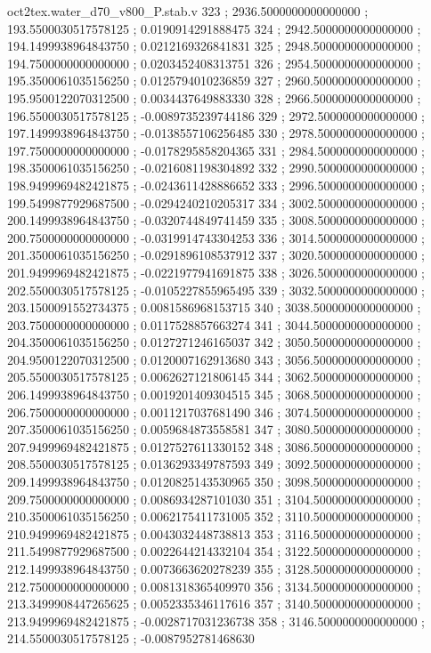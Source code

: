 \begin{filecontents}[overwrite]{oct2tex.water_d70_v800_P.stab.v}
323 ; 2936.5000000000000000 ; 193.5500030517578125 ; 0.0190914291888475
324 ; 2942.5000000000000000 ; 194.1499938964843750 ; 0.0212169326841831
325 ; 2948.5000000000000000 ; 194.7500000000000000 ; 0.0203452408313751
326 ; 2954.5000000000000000 ; 195.3500061035156250 ; 0.0125794010236859
327 ; 2960.5000000000000000 ; 195.9500122070312500 ; 0.0034437649883330
328 ; 2966.5000000000000000 ; 196.5500030517578125 ; -0.0089735239744186
329 ; 2972.5000000000000000 ; 197.1499938964843750 ; -0.0138557106256485
330 ; 2978.5000000000000000 ; 197.7500000000000000 ; -0.0178295858204365
331 ; 2984.5000000000000000 ; 198.3500061035156250 ; -0.0216081198304892
332 ; 2990.5000000000000000 ; 198.9499969482421875 ; -0.0243611428886652
333 ; 2996.5000000000000000 ; 199.5499877929687500 ; -0.0294240210205317
334 ; 3002.5000000000000000 ; 200.1499938964843750 ; -0.0320744849741459
335 ; 3008.5000000000000000 ; 200.7500000000000000 ; -0.0319914743304253
336 ; 3014.5000000000000000 ; 201.3500061035156250 ; -0.0291896108537912
337 ; 3020.5000000000000000 ; 201.9499969482421875 ; -0.0221977941691875
338 ; 3026.5000000000000000 ; 202.5500030517578125 ; -0.0105227855965495
339 ; 3032.5000000000000000 ; 203.1500091552734375 ; 0.0081586968153715
340 ; 3038.5000000000000000 ; 203.7500000000000000 ; 0.0117528857663274
341 ; 3044.5000000000000000 ; 204.3500061035156250 ; 0.0127271246165037
342 ; 3050.5000000000000000 ; 204.9500122070312500 ; 0.0120007162913680
343 ; 3056.5000000000000000 ; 205.5500030517578125 ; 0.0062627121806145
344 ; 3062.5000000000000000 ; 206.1499938964843750 ; 0.0019201409304515
345 ; 3068.5000000000000000 ; 206.7500000000000000 ; 0.0011217037681490
346 ; 3074.5000000000000000 ; 207.3500061035156250 ; 0.0059684873558581
347 ; 3080.5000000000000000 ; 207.9499969482421875 ; 0.0127527611330152
348 ; 3086.5000000000000000 ; 208.5500030517578125 ; 0.0136293349787593
349 ; 3092.5000000000000000 ; 209.1499938964843750 ; 0.0120825143530965
350 ; 3098.5000000000000000 ; 209.7500000000000000 ; 0.0086934287101030
351 ; 3104.5000000000000000 ; 210.3500061035156250 ; 0.0062175411731005
352 ; 3110.5000000000000000 ; 210.9499969482421875 ; 0.0043032448738813
353 ; 3116.5000000000000000 ; 211.5499877929687500 ; 0.0022644214332104
354 ; 3122.5000000000000000 ; 212.1499938964843750 ; 0.0073663620278239
355 ; 3128.5000000000000000 ; 212.7500000000000000 ; 0.0081318365409970
356 ; 3134.5000000000000000 ; 213.3499908447265625 ; 0.0052335346117616
357 ; 3140.5000000000000000 ; 213.9499969482421875 ; -0.0028717031236738
358 ; 3146.5000000000000000 ; 214.5500030517578125 ; -0.0087952781468630

\end{filecontents}
